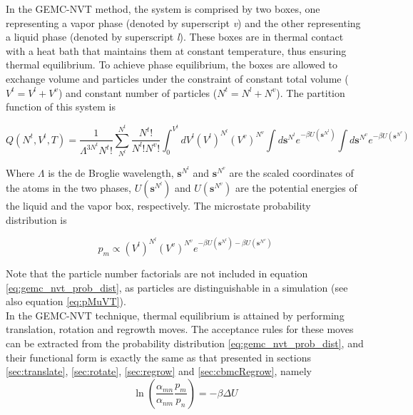 In the GEMC-NVT method, the system is comprised by two boxes, one representing a vapor phase 
(denoted by superscript \textit{v}) and the other representing a liquid phase (denoted by superscript \textit{l}).
These boxes are in thermal contact with a heat bath that maintains them at constant temperature, thus ensuring
thermal equilibrium.
To achieve phase equilibrium, the boxes are allowed to exchange volume and particles under the constraint of constant total volume ($V^t=V^l + V^v$)
and constant number of particles ($N^t=N^l + N^v$). The partition function of this system is

\begin{equation}
Q\left(N^t,V^t,T\right) = \frac{1}{\Lambda^{3N^t}N^t!} \sum^{N^t}_{N{^l}} \frac{N^t!}{N^l!N^v!} \int^{V^t}_0  dV^l (V^l)^{N^l} (V^v)^{N^v} \int d \textbf{s}^{N^l} e^{-\beta U\left(\textbf{s}^{N^l}\right)} \int d \textbf{s}^{N^v} e^{-\beta U\left(\textbf{s}^{N^v}\right)}
\label{eq:gemc_nvt_partition}
\end{equation}


Where $\Lambda$ is the de Broglie wavelength, $\textbf{s}^{N^l}$ and $\textbf{s}^{N^v}$ are the scaled coordinates of the atoms in the two phases, $U\left(\textbf{s}^{N^l}\right)$ and $U\left(\textbf{s}^{N^v}\right)$ are the potential energies of the liquid and the vapor box, respectively. The microstate probability distribution is

\begin{equation}
p_m \propto (V^l)^{N^l} (V^v)^{N^v} e^{-\beta U \left(\textbf{s}^{N^l}\right) -\beta U \left(\textbf{s}^{N^v}\right)}
\label{eq:gemc_nvt_prob_dist}
\end{equation}

Note that the particle number factorials are not included in equation \ref{eq:gemc_nvt_prob_dist}, as particles are
distinguishable in a simulation (see also equation \ref{eq:pMuVT}). \\

In the GEMC-NVT technique, thermal equilibrium is attained by performing translation, rotation and regrowth moves. 
The acceptance rules for these moves can be extracted from the probability 
distribution \ref{eq:gemc_nvt_prob_dist}, and their functional form is exactly the same as that presented
in sections \ref{sec:translate}, \ref{sec:rotate}, \ref{sec:regrow} and \ref{sec:cbmcRegrow}, namely \\


\begin{equation}
\ln \left( \frac{\alpha_{mn}}{\alpha_{nm}} \frac{p_m}{p_n} \right) = - \beta \Delta U
\end{equation}


